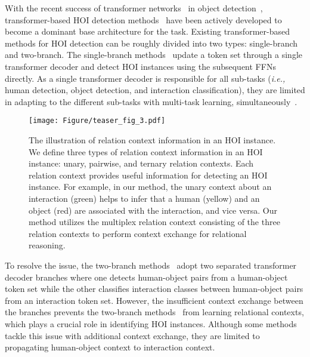 \documentclass[10pt,twocolumn,letterpaper]{article}
\begin{document}
With the recent success of transformer networks~\cite{vaswani2017attention} in object detection~\cite{detr,zhu2020deformable}, transformer-based HOI detection  methods~\cite{zhang2021cdn,chen2021asnet,kim2022mstr,kim2021hotr,tamura2021qpic,zou2021hoitrans,zhou2022distr}   have been actively developed to become a dominant base architecture for the task. 
Existing transformer-based methods for HOI detection can be roughly divided into two types: single-branch and two-branch.
The single-branch methods~\cite{tamura2021qpic,kim2022mstr,zou2021hoitrans} update a token set through a single transformer decoder and detect HOI instances using the subsequent FFNs directly. 
As a single transformer decoder is responsible for all sub-tasks (\textit{i.e.,} human detection, object detection, and interaction classification), they are limited in adapting to the different sub-tasks with multi-task learning, simultaneously~\cite{zhang2021cdn}.
\begin{figure}[t]
\begin{center}
   \texttt{[image: Figure/teaser\_fig\_3.pdf]}
\end{center}
   \caption{The illustration of relation context information in an HOI instance. We define three types of relation context information in an HOI instance: unary, pairwise, and ternary relation contexts.
   Each relation context provides useful information for detecting an HOI instance.
   For example, in our method, the unary context about an interaction (green) helps to infer that a human (yellow) and an object (red) are associated with the interaction, and vice versa. Our method utilizes the multiplex relation context consisting of the three relation contexts to perform context exchange for relational reasoning.
   }
   \vspace{-3mm}
\label{fig:teaser}
\end{figure}
To resolve the issue, the two-branch methods~\cite{zhang2021cdn,kim2021hotr,zhang2022upt,chen2021asnet, zhou2022distr} adopt two separated transformer decoder branches where one detects human-object pairs from a human-object token set while the other classifies interaction classes between  human-object pairs from an interaction token set.
However, the insufficient context exchange between the branches prevents the two-branch methods~\cite{kim2021hotr,zhang2021cdn,zhang2022upt} from learning relational contexts, which plays a crucial role in identifying HOI instances.
Although some methods~\cite{chen2021asnet, zhou2022distr} tackle this issue with additional context exchange, they are limited to propagating human-object context to interaction context.
\end{document}

